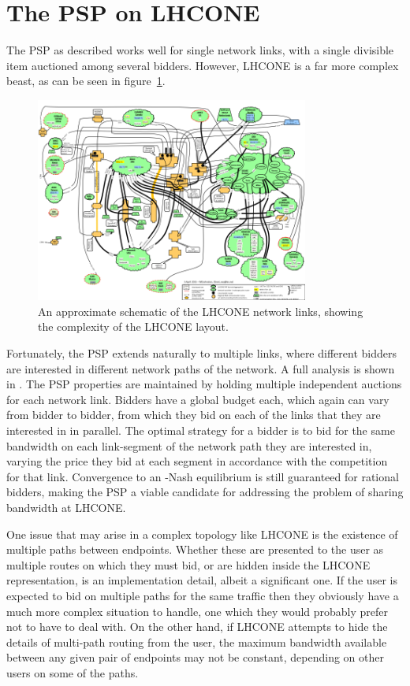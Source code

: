 \section{The PSP on LHCONE}

The PSP as described works well for single network links, with a single divisible item auctioned among several bidders. However, LHCONE is a far more complex beast, as can be seen in figure~\ref{fig:lhcone}.

\begin{figure}[h]
 \centering
   \includegraphics[width=0.8\textwidth]{LHCONE}
       \caption{An approximate schematic of the LHCONE network links, showing the complexity of the LHCONE layout.}
 \label{fig:lhcone}
\end{figure}

Fortunately, the PSP extends naturally to multiple links, where different bidders are interested in different network paths of the network. A full analysis is shown in \cite{PSP-multi}. The PSP properties are maintained by holding multiple independent auctions for each network link. Bidders have a global budget each, which again can vary from bidder to bidder, from which they bid on each of the links that they are interested in in parallel. The optimal strategy for a bidder is to bid for the same bandwidth on each link-segment of the network path they are interested in, varying the price they bid at each segment in accordance with the competition for that link. Convergence to an \textepsilon-Nash equilibrium is still guaranteed for rational bidders, making the PSP a viable candidate for addressing the problem of sharing bandwidth at LHCONE.

One issue that may arise in a complex topology like LHCONE is the existence of multiple paths between endpoints. Whether these are presented to the user as multiple routes on which they must bid, or are hidden inside the LHCONE representation, is an implementation detail, albeit a significant one. If the user is expected to bid on multiple paths for the same traffic then they obviously have a much more complex situation to handle, one which they would probably prefer not to have to deal with. On the other hand, if LHCONE attempts to hide the details of multi-path routing from the user, the maximum bandwidth available between any given pair of endpoints may not be constant, depending on other users on some of the paths.